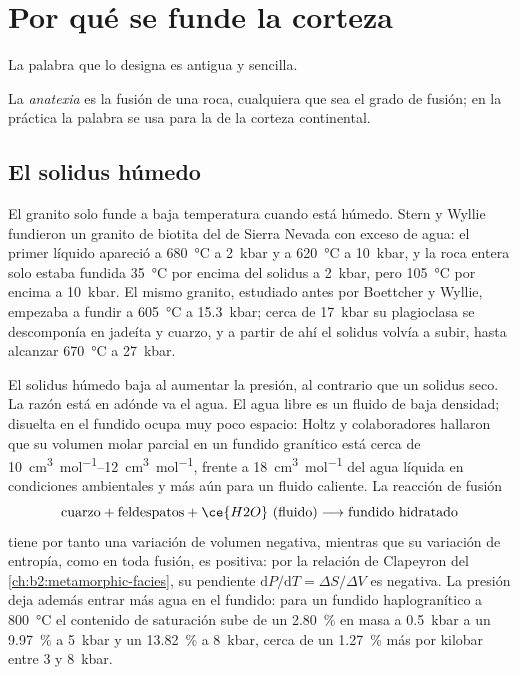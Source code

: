 \section{Por qué se funde la corteza}\label{sec:b2:crustal-melting:why}

La palabra que lo designa es antigua y sencilla.

\begin{definition}[Anatexia]\label{def:b2:crustal-melting:anatexis}
La \emph{anatexia} es la fusión de una roca, cualquiera que sea el grado de fusión;
en la práctica la palabra se usa para la  de la corteza continental.
\end{definition}

\subsection*{El solidus húmedo}

El granito solo funde a baja temperatura cuando está húmedo. Stern y Wyllie fundieron un granito de
biotita del  de Sierra Nevada con exceso de agua: el primer líquido apareció a
\qty{680}{\celsius} a \qty{2}{kbar} y a \qty{620}{\celsius} a \qty{10}{kbar}, y la
roca entera solo estaba fundida \qty{35}{\celsius} por encima del solidus a \qty{2}{kbar}, pero
\qty{105}{\celsius} por encima a \qty{10}{kbar}. El mismo granito, estudiado antes por
Boettcher y Wyllie, empezaba a fundir a \qty{605}{\celsius} a \qty{15.3}{kbar}; cerca de
\qty{17}{kbar} su plagioclasa se descomponía en jadeíta y cuarzo, y a partir de ahí el solidus
volvía a subir, hasta alcanzar \qty{670}{\celsius} a \qty{27}{kbar}.

El solidus húmedo baja al aumentar la presión, al contrario que un solidus seco. La razón está en adónde
va el agua. El agua libre es un fluido de baja densidad; disuelta en el fundido ocupa muy
poco espacio: Holtz y colaboradores hallaron que su volumen molar parcial en un fundido granítico está cerca
de \qtyrange{10}{12}{\cubic\centi\metre\per\mole}, frente a \qty{18}{\cubic\centi\metre\per\mole}
del agua líquida en condiciones ambientales y más aún para un fluido caliente. La reacción de fusión
\[\text{cuarzo} + \text{feldespatos} + \ce{H2O}\ (\text{fluido}) \longrightarrow
\text{fundido hidratado}\]
tiene por tanto una variación de volumen negativa, mientras que su variación de entropía, como en toda fusión, es
positiva: por la relación de Clapeyron del \cref{ch:b2:metamorphic-facies}, su pendiente
$\mathrm{d}P/\mathrm{d}T = \Delta S/\Delta V$ es negativa. La presión deja además entrar más agua
en el fundido: para un fundido haplogranítico a \qty{800}{\celsius} el contenido de saturación sube
de un \qty{2.80}{\percent} en masa a \qty{0.5}{kbar} a un \qty{9.97}{\percent} a
\qty{5}{kbar} y un \qty{13.82}{\percent} a \qty{8}{kbar}, cerca de un \qty{1.27}{\percent} más
por kilobar entre 3 y \qty{8}{kbar}.

